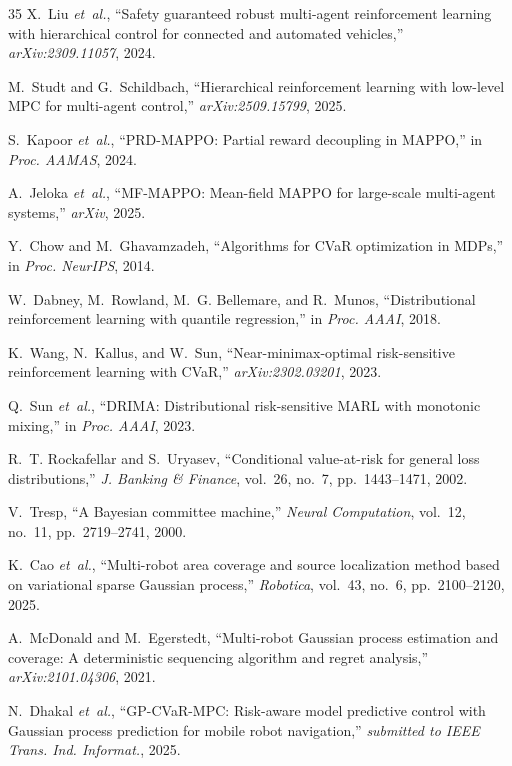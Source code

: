 \documentclass[letterpaper]{IEEEtran}
\begin{document}
\begin{thebibliography}{35}
X.~Liu \emph{et~al.}, ``Safety guaranteed robust multi-agent reinforcement learning with hierarchical control for connected and automated vehicles,'' \emph{arXiv:2309.11057}, 2024.

M.~Studt and G.~Schildbach, ``Hierarchical reinforcement learning with low-level MPC for multi-agent control,'' \emph{arXiv:2509.15799}, 2025.

S.~Kapoor \emph{et~al.}, ``PRD-MAPPO: Partial reward decoupling in MAPPO,'' in \emph{Proc. AAMAS}, 2024.

A.~Jeloka \emph{et~al.}, ``MF-MAPPO: Mean-field MAPPO for large-scale multi-agent systems,'' \emph{arXiv}, 2025.

Y.~Chow and M.~Ghavamzadeh, ``Algorithms for CVaR optimization in MDPs,'' in \emph{Proc. NeurIPS}, 2014.

W.~Dabney, M.~Rowland, M.~G. Bellemare, and R.~Munos, ``Distributional reinforcement learning with quantile regression,'' in \emph{Proc. AAAI}, 2018.

K.~Wang, N.~Kallus, and W.~Sun, ``Near-minimax-optimal risk-sensitive reinforcement learning with CVaR,'' \emph{arXiv:2302.03201}, 2023.

Q.~Sun \emph{et~al.}, ``DRIMA: Distributional risk-sensitive MARL with monotonic mixing,'' in \emph{Proc. AAAI}, 2023.

R.~T. Rockafellar and S.~Uryasev, ``Conditional value-at-risk for general loss distributions,'' \emph{J. Banking \& Finance}, vol.~26, no.~7, pp.~1443--1471, 2002.

V.~Tresp, ``A Bayesian committee machine,'' \emph{Neural Computation}, vol.~12, no.~11, pp.~2719--2741, 2000.

K.~Cao \emph{et~al.}, ``Multi-robot area coverage and source localization method based on variational sparse Gaussian process,'' \emph{Robotica}, vol.~43, no.~6, pp.~2100--2120, 2025.

A.~McDonald and M.~Egerstedt, ``Multi-robot Gaussian process estimation and coverage: A deterministic sequencing algorithm and regret analysis,'' \emph{arXiv:2101.04306}, 2021.

N.~Dhakal \emph{et~al.}, ``GP-CVaR-MPC: Risk-aware model predictive control with Gaussian process prediction for mobile robot navigation,'' \emph{submitted to IEEE Trans. Ind. Informat.}, 2025.


\end{thebibliography}
\end{document}
